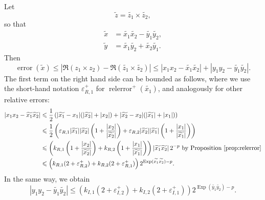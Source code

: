 \documentclass [12pt]{article}
\newcommand {\corr}[1]{{#1}}
\newcommand {\appro}[1]{\widetilde {#1}}
\DeclareMathOperator{\Exp}{\operatorname {Exp}}
\newcommand{\error}{\operatorname {error}}
\newcommand{\relerror}{\operatorname {relerror}}
\renewcommand {\epsilon}{\varepsilon}
\renewcommand {\leq}{\leqslant}
\begin{document}
Let
\[
\appro z = \appro {z_1} \times \appro {z_2},
\]
so that
\begin {align*}
\appro x & = \appro {x_1} \appro {x_2} - \appro {y_1} \appro {y_2}, \\
\appro y & = \appro {x_1} \appro {y_2} + \appro {x_2} \appro {y_1}.
\end {align*}
Then
\[
\error (\appro x)
\leq | \Re (\corr {z_1} \times \corr {z_2})
- \Re (\appro {z_1} \times \appro {z_2})|
\leq
| \corr {x_1} \corr {x_2} - \appro {x_1} \appro {x_2}|
+ | \corr {y_1} \corr {y_2} - \appro {y_1} \appro {y_2}|.
\]
The first term on the right hand side can be bounded as follows,
where we use the short-hand notation $\epsilon_{R, 1}^+$ for
$\relerror^+ (\appro {x_1})$, and analogously for other relative errors:
\begin{align*}
| \corr {x_1} \corr {x_2} - \appro {x_1} \appro {x_2}|
& \leq
\frac{1}{2} \left(
  |\appro {x_1} - \corr {x_1}| (|\appro {x_2}| + |\corr {x_2}|)
+ |\appro {x_2} - \corr {x_2}| (|\appro {x_1}| + |\corr {x_1}|)
\right)
\\
& \leq \frac {1}{2} \left(
  \epsilon_{R, 1} |\appro {x_1}| |\appro {x_2}|
  \left( 1 + \frac {|\corr {x_2}|}{|\appro {x_2}|} \right)
+ \epsilon_{R, 2} |\appro {x_2}| |\appro {x_1}|
  \left( 1 + \frac {|\corr {x_1}|}{|\appro {x_1}|} \right)
  \right)
\\
& \leq \left(
  k_{R, 1}
  \left( 1 + \frac {|\corr {x_2}|}{|\appro {x_2}|} \right)
+ k_{R, 2}
  \left( 1 + \frac {|\corr {x_1}|}{|\appro {x_1}|} \right)
  \right) |\appro {x_1} \appro {x_2}| \, 2^{-p}
  \text { by Proposition~\ref {prop:relerror}}
\\
& \leq \left(
   k_{R, 1} (2 + \epsilon_{R, 2}^+)
   + k_{R, 2} (2 + \epsilon_{R, 1}^+)
   \right) 2^{\Exp (\appro {x_1} \appro {x_2}) - p}.
\end{align*}
In the same way, we obtain
\[
| \corr {y_1} \corr {y_2} - \appro {y_1} \appro {y_2}|
\leq \left(
   k_{I, 1} (2 + \epsilon_{I, 2}^+)
   + k_{I, 2} (2 + \epsilon_{I, 1}^+)
   \right) 2^{\Exp (\appro {y_1} \appro {y_2}) - p}.
\]
\end{document}
